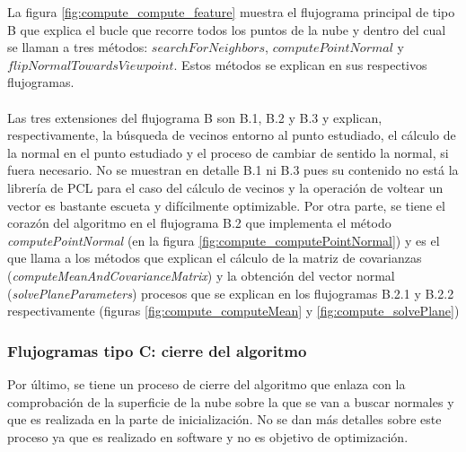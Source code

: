 La figura \ref{fig:compute_compute_feature} muestra el flujograma principal de tipo B que explica el bucle que recorre todos los puntos de la nube y dentro del cual se llaman a tres métodos: $searchForNeighbors$, $computePointNormal$ y $flipNormalTowardsViewpoint$. Estos métodos se explican en sus respectivos flujogramas.
\\
\\
Las tres extensiones del flujograma B son B.1, B.2 y B.3 y explican, respectivamente, la búsqueda de vecinos entorno al punto estudiado, el cálculo de la normal en el punto estudiado y el proceso de cambiar de sentido la normal, si fuera necesario. No se muestran en detalle B.1 ni B.3 pues su contenido no está la librería de PCL para el caso del cálculo de vecinos y la operación de voltear un vector es bastante escueta y difícilmente optimizable. Por otra parte, se tiene el corazón del algoritmo en el flujograma B.2 que implementa el método \textit{computePointNormal}\cite{calculo_compute_point_normal} (en la figura \ref{fig:compute_computePointNormal}) y es el que llama a los métodos que explican el cálculo de la matriz de covarianzas (\textit{computeMeanAndCovarianceMatrix}) y la obtención del vector normal (\textit{solvePlaneParameters}) procesos que se explican en los flujogramas B.2.1 y B.2.2 respectivamente (figuras \ref{fig:compute_computeMean} y \ref{fig:compute_solvePlane})




\subsubsection{Flujogramas tipo C: cierre del algoritmo}
Por último, se tiene un proceso de cierre del algoritmo que enlaza con la comprobación de la superficie de la nube sobre la que se van a buscar normales y que es realizada en la parte de inicialización. No se dan más detalles sobre este proceso ya que es realizado en software y no es objetivo de optimización.



